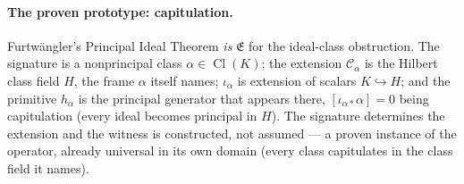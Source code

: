 \documentclass[11pt]{article}
\theoremstyle{definition}
\begin{document}
\paragraph{The proven prototype: capitulation.} Furtw\"angler's Principal Ideal Theorem \emph{is} $\mathfrak E$
for the ideal-class obstruction. The signature is a nonprincipal class $\alpha\in\operatorname{Cl}(K)$; the
extension $\mathcal C_\alpha$ is the Hilbert class field $H$, the frame $\alpha$ itself names; $\iota_\alpha$ is
extension of scalars $K\hookrightarrow H$; and the primitive $h_\alpha$ is the principal generator that appears
there, $[\iota_{\alpha*}\alpha]=0$ being capitulation (every ideal becomes principal in $H$). The signature
determines the extension and the witness is constructed, not assumed --- a proven instance of the operator,
already universal in its own domain (every class capitulates in the class field it names).
\end{document}

